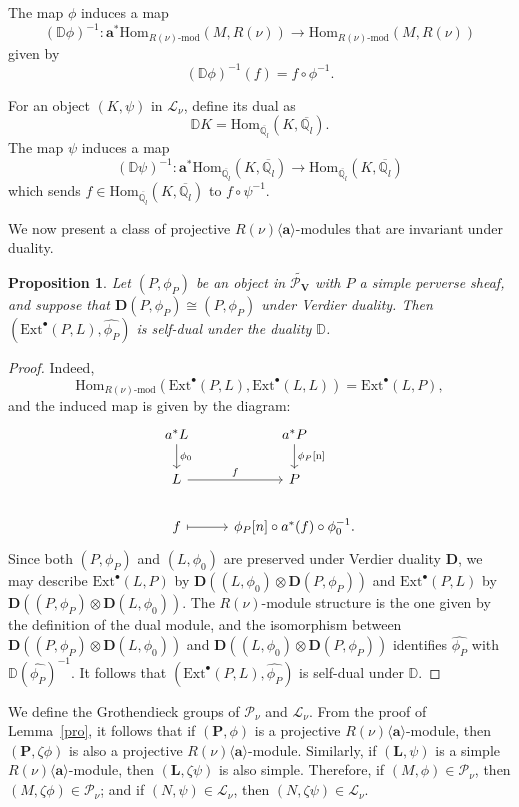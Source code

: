 \documentclass[10pt,a4paper]{amsart}
\newtheorem{proposition}[theorem]{Proposition}
\newcommand\bbq{{\mathbb Q}}
\begin{document}
The map $\phi$ induces a map
\[
(\mathbb{D}\phi)^{-1} : \mathbf{a}^* \mathrm{Hom}_{R(\nu)\text{-}\mathrm{mod}}(M, R(\nu)) \to \mathrm{Hom}_{R(\nu)\text{-}\mathrm{mod}}(M, R(\nu))
\]
given by
\[
(\mathbb{D}\phi)^{-1}(f) = f \circ \phi^{-1}.
\]

For an object $(K, \psi)$ in $\mathcal{L}_{\nu}$, define its dual as
\[
\mathbb{D}K = \mathrm{Hom}_{\overline{\bbq_l}}(K, {\overline{\bbq_l}}).
\]
The map $\psi$ induces a map
\[
(\mathbb{D}\psi)^{-1} : \mathbf{a}^* \mathrm{Hom}_{\overline{\bbq_l}}(K, {\overline{\bbq_l}}) \to \mathrm{Hom}_{\overline{\bbq_l}}(K, {\overline{\bbq_l}})
\]
which sends $f \in \mathrm{Hom}_{\overline{\bbq_l}}(K, {\overline{\bbq_l}})$ to $f \circ \psi^{-1}$.

We now present a class of projective $R(\nu)\langle\mathbf{a}\rangle$-modules that are invariant under duality.

\begin{proposition}\label{dual}
Let $(P, \phi_P)$ be an object in $\widetilde{\mathcal{P}_{\mathbf{V}}}$ with $P$ a simple perverse sheaf, and suppose that $\mathbf{D}(P, \phi_P) \cong (P, \phi_P)$ under Verdier duality. Then $(\mathrm{Ext}^{\bullet}(P, L), \hat{\phi_P})$ is self-dual under the duality $\mathbb{D}$.
\end{proposition}

\begin{proof}
Indeed,
\[
\mathrm{Hom}_{R(\nu)\text{-}\mathrm{mod}}(\mathrm{Ext}^{\bullet}(P, L), \mathrm{Ext}^{\bullet}(L, L)) = \mathrm{Ext}^{\bullet}(L, P),
\]
and the induced map is given by the diagram:
\[
\begin{tikzcd}
a^* L \arrow[d, "\phi_0"] & a^* P \arrow[d, "\phi_P\text{[n]}"] \\
L \arrow[r, "f"] & P \\
f \arrow[r, maps to] & \phi_P[n] \circ a^*(f) \circ \phi_0^{-1}.
\end{tikzcd}
\]
Since both $(P, \phi_P)$ and $(L, \phi_0)$ are preserved under Verdier duality $\mathbf{D}$, we may describe $\mathrm{Ext}^{\bullet}(L, P)$ by $\mathbf{D}((L, \phi_0) \otimes \mathbf{D}(P, \phi_P))$ and $\mathrm{Ext}^{\bullet}(P, L)$ by $\mathbf{D}((P, \phi_P) \otimes \mathbf{D}(L, \phi_0))$. The $R(\nu)$-module structure is the one given by the definition of the dual module, and the isomorphism between $\mathbf{D}((P, \phi_P) \otimes \mathbf{D}(L, \phi_0))$ and $\mathbf{D}((L, \phi_0) \otimes \mathbf{D}(P, \phi_P))$ identifies $\hat{\phi_P}$ with $\mathbb{D}(\hat{\phi_P})^{-1}$. It follows that $(\mathrm{Ext}^{\bullet}(P, L), \hat{\phi_P})$ is self-dual under $\mathbb{D}$.
\end{proof}
We define the Grothendieck groups of $\mathcal{P}_{\nu}$ and $\mathcal{L}_{\nu}$. From the proof of Lemma~\ref{pro}, it follows that if $(\mathbf{P}, \phi)$ is a projective $R(\nu)\langle\mathbf{a}\rangle$-module, then $(\mathbf{P}, \zeta \phi)$ is also a projective $R(\nu)\langle\mathbf{a}\rangle$-module. Similarly, if $(\mathbf{L}, \psi)$ is a simple $R(\nu)\langle\mathbf{a}\rangle$-module, then $(\mathbf{L}, \zeta \psi)$ is also simple. Therefore, if $(M, \phi) \in \mathcal{P}_{\nu}$, then $(M, \zeta \phi) \in \mathcal{P}_{\nu}$; and if $(N, \psi) \in \mathcal{L}_{\nu}$, then $(N, \zeta \psi) \in \mathcal{L}_{\nu}$.
\end{document}
